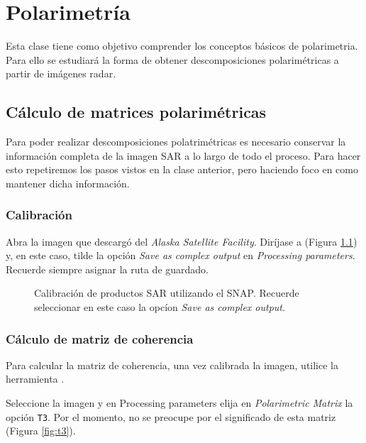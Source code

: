 \chapter{Polarimetría}

Esta clase tiene como objetivo comprender los conceptos básicos de polarimetria. Para ello se estudiará la forma de obtener descomposiciones polarimétricas a partir de imágenes radar.

\section{Cálculo de matrices polarimétricas}

Para poder realizar descomposiciones polatrimétricas es necesario conservar la información completa de la imagen SAR a lo largo de todo el proceso. Para hacer esto repetiremos los pasos vistos en la clase anterior, pero haciendo foco en como mantener dicha información.

\subsection{Calibración}
Abra la imagen  que descargó del \emph{Alaska Satellite Facility}.  Diríjase a  (Figura \ref{fig:calibrar}) y, en este caso, tilde la opción \emph{Save as complex output} en \emph{Processing parameters}. Recuerde siempre asignar la ruta de guardado.

\begin{figure}[h!]
    \centering
    \hspace{1cm}
    \caption{Calibración de productos SAR utilizando el SNAP. Recuerde seleccionar en este caso la opcíon \emph{Save as complex output}.}
    \label{fig:calibrar}
\end{figure}

\subsection{Cálculo de matriz de coherencia}

Para calcular la matriz de coherencia, una vez calibrada la imagen, utilice la herramienta .

Seleccione la imagen  y en Processing parameters elija en \emph{Polarimetric Matrix} la opción \texttt{T3}. Por el momento, no se preocupe por el significado de esta matriz (Figura \ref{fig:t3}).

